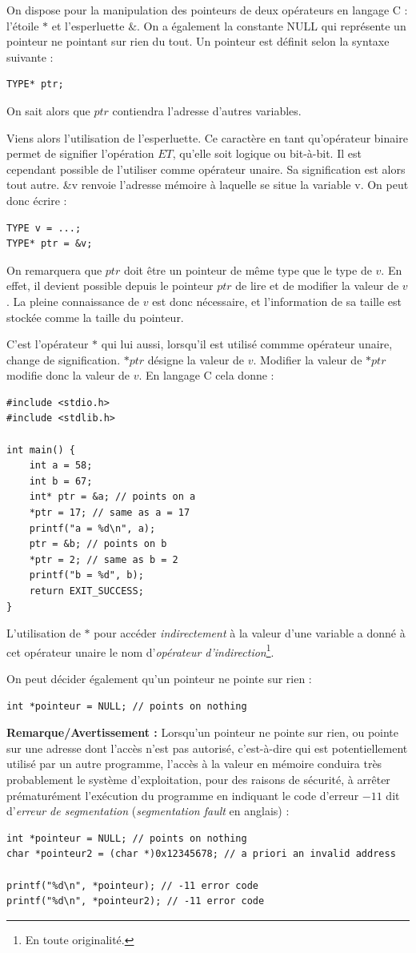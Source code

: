 \documentclass[../../../main.tex]{subfiles}
\begin{document}
On dispose pour la manipulation des pointeurs de deux opérateurs en langage C : l'étoile $\ast$ et l'esperluette $\&$. On a également la constante \textsf{NULL} qui représente un pointeur ne pointant sur rien du tout. 
Un pointeur est définit selon la syntaxe suivante :
\begin{verbatim}
TYPE* ptr;
\end{verbatim}
On sait alors que $ptr$ contiendra l'adresse d'autres variables.
 
Viens alors l'utilisation de l'esperluette. Ce caractère en tant qu'opérateur binaire permet de signifier l'opération $ET$, qu'elle soit logique ou bit-à-bit. Il est cependant possible de l'utiliser comme opérateur unaire. Sa signification est alors tout autre. \textsf{\&v} renvoie l'adresse mémoire à laquelle se situe la variable \textsf{v}. On peut donc écrire :
\begin{verbatim}
TYPE v = ...;
TYPE* ptr = &v;
\end{verbatim}
On remarquera que $ptr$ doit être un pointeur de même type que le type de $v$. En effet, il devient possible depuis le pointeur $ptr$ de lire et de modifier la valeur de $v$. La pleine connaissance de $v$ est donc nécessaire, et l'information de sa taille est stockée comme la taille du pointeur.
 
C'est l'opérateur $*$ qui lui aussi, lorsqu'il est utilisé commme opérateur unaire, change de signification. $*ptr$ désigne la valeur de $v$. Modifier la valeur de $*ptr$ modifie donc la valeur de $v$. En langage C cela donne :
\begin{verbatim}
#include <stdio.h>
#include <stdlib.h>

int main() {
	int a = 58;
	int b = 67;
	int* ptr = &a; // points on a
	*ptr = 17; // same as a = 17
	printf("a = %d\n", a);
	ptr = &b; // points on b
	*ptr = 2; // same as b = 2
	printf("b = %d", b);
	return EXIT_SUCCESS;
}
\end{verbatim}
L'utilisation de $\ast$ pour accéder \textit{indirectement} à la valeur d'une variable a donné à cet opérateur unaire le nom d'\textit{opérateur d'indirection}\footnote{En toute originalité.}.
 
On peut décider également qu'un pointeur ne pointe sur rien :
\begin{verbatim}
int *pointeur = NULL; // points on nothing
\end{verbatim}
\textbf{Remarque/Avertissement :} Lorsqu'un pointeur ne pointe sur rien, ou pointe sur une adresse dont l'accès n'est pas autorisé, c'est-à-dire qui est potentiellement utilisé par un autre programme, l'accès à la valeur en mémoire conduira très probablement le système d'exploitation, pour des raisons de sécurité, à arrêter prématurément l'exécution du programme en indiquant le code d'erreur $-11$ dit d'\textit{erreur de segmentation} (\textit{segmentation fault} en anglais) :
\begin{verbatim}
int *pointeur = NULL; // points on nothing
char *pointeur2 = (char *)0x12345678; // a priori an invalid address 

printf("%d\n", *pointeur); // -11 error code
printf("%d\n", *pointeur2); // -11 error code
\end{verbatim}
\end{document}
